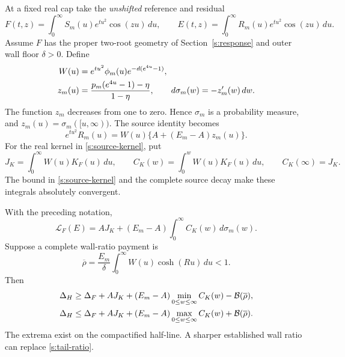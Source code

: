 At a fixed real cap take the \emph{unshifted} reference and residual
\begin{equation}
 F(t,z)=\int_0^\infty S_m(u)e^{tu^2}\cos(zu)\,du,
 \qquad E(t,z)=\int_0^\infty R_m(u)e^{tu^2}\cos(zu)\,du.
 \label{s:unshifted-head}
\end{equation}
Assume $F$ has the proper two-root geometry of Section~\ref{s:response}
and outer wall floor $\delta>0$.  Define
\begin{align}
 W(u)&=e^{tu^2}\phi_m(u)e^{-d(e^{4u}-1)},\notag\\
 z_m(u)&=\frac{p_m(e^{4u}-1)-\eta}{1-\eta},\qquad
 d\sigma_m(w)=-z_m'(w)\,dw.
 \label{s:monotone-tail}
\end{align}
The function $z_m$ decreases from one to zero.  Hence $\sigma_m$ is
a probability measure, and $z_m(u)=\sigma_m([u,\infty))$.
The source identity becomes
\begin{equation}
 e^{tu^2}R_m(u)=W(u)\{A+(E_m-A)z_m(u)\}.
 \label{s:affine-multiplier}
\end{equation}
For the real kernel in \eqref{s:source-kernel}, put
\[
 J_K=\int_0^\infty W(u)K_F(u)\,du,
 \qquad C_K(w)=\int_0^wW(u)K_F(u)\,du,
 \qquad C_K(\infty)=J_K.
\]
The bound in \eqref{s:source-kernel} and the complete source decay
make these integrals absolutely convergent.

\begin{theorem}
\label{s:tail-discriminant}
With the preceding notation,
\begin{equation}
 \mathcal L_F(E)=A J_K+(E_m-A)
                        \int_0^\infty C_K(w)\,d\sigma_m(w).
 \label{s:tail-response}
\end{equation}
Suppose a complete wall-ratio payment is
\begin{equation}
 \overline\rho=\frac{E_m}{\delta}
                \int_0^\infty W(u)\cosh(Ru)\,du<1.
 \label{s:tail-ratio}
\end{equation}
Then
\begin{align}
 \Delta_H&\ge\Delta_F+A J_K+(E_m-A)\min_{0\le w\le\infty}C_K(w)
                         -\mathcal B(\overline\rho),\notag\\
 \Delta_H&\le\Delta_F+A J_K+(E_m-A)\max_{0\le w\le\infty}C_K(w)
                         +\mathcal B(\overline\rho).
 \label{s:canonical-interval}
\end{align}
The extrema exist on the compactified half-line.  A sharper established
wall ratio can replace \eqref{s:tail-ratio}.
\end{theorem}

